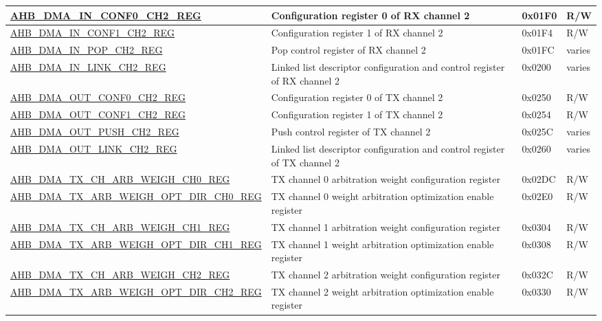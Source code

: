 \begin{longtable}{ | p{8cm} | p{8cm} | p{1.3cm} | p{1.5cm} | }
\hyperref[regdesc:AHBDMAINCONF0CHNREG]{AHB\_DMA\_IN\_CONF0\_CH2\_REG} & Configuration register 0 of RX channel 2 & 0x01F0 & R/W \\ \hline
\hyperref[regdesc:AHBDMAINCONF1CHNREG]{AHB\_DMA\_IN\_CONF1\_CH2\_REG} & Configuration register 1 of RX channel 2 & 0x01F4 & R/W \\ \hline
\hyperref[regdesc:AHBDMAINPOPCHNREG]{AHB\_DMA\_IN\_POP\_CH2\_REG} & Pop control register of RX channel 2 & 0x01FC & varies \\ \hline
\hyperref[regdesc:AHBDMAINLINKCHNREG]{AHB\_DMA\_IN\_LINK\_CH2\_REG} & Linked list descriptor configuration and control register of RX channel 2 & 0x0200 & varies \\ \hline
\hyperref[regdesc:AHBDMAOUTCONF0CHNREG]{AHB\_DMA\_OUT\_CONF0\_CH2\_REG} & Configuration register 0 of TX channel 2 & 0x0250 & R/W \\ \hline
\hyperref[regdesc:AHBDMAOUTCONF1CHNREG]{AHB\_DMA\_OUT\_CONF1\_CH2\_REG} & Configuration register 1 of TX channel 2 & 0x0254 & R/W \\ \hline
\hyperref[regdesc:AHBDMAOUTPUSHCHNREG]{AHB\_DMA\_OUT\_PUSH\_CH2\_REG} & Push control register of TX channel 2 & 0x025C & varies \\ \hline
\hyperref[regdesc:AHBDMAOUTLINKCHNREG]{AHB\_DMA\_OUT\_LINK\_CH2\_REG} & Linked list descriptor configuration and control register of TX channel 2 & 0x0260 & varies \\ \hline
\hyperref[regdesc:AHBDMATXCHARBWEIGHCHNREG]{AHB\_DMA\_TX\_CH\_ARB\_WEIGH\_CH0\_REG} & TX channel 0 arbitration weight configuration register & 0x02DC & R/W \\ \hline
\hyperref[regdesc:AHBDMATXARBWEIGHOPTDIRCHNREG]{AHB\_DMA\_TX\_ARB\_WEIGH\_OPT\_DIR\_CH0\_REG} & TX channel 0 weight arbitration optimization enable register & 0x02E0 & R/W \\ \hline
\hyperref[regdesc:AHBDMATXCHARBWEIGHCHNREG]{AHB\_DMA\_TX\_CH\_ARB\_WEIGH\_CH1\_REG} & TX channel 1 arbitration weight configuration register & 0x0304 & R/W \\ \hline
\hyperref[regdesc:AHBDMATXARBWEIGHOPTDIRCHNREG]{AHB\_DMA\_TX\_ARB\_WEIGH\_OPT\_DIR\_CH1\_REG} & TX channel 1 weight arbitration optimization enable register & 0x0308 & R/W \\ \hline
\hyperref[regdesc:AHBDMATXCHARBWEIGHCHNREG]{AHB\_DMA\_TX\_CH\_ARB\_WEIGH\_CH2\_REG} & TX channel 2 arbitration weight configuration register & 0x032C & R/W \\ \hline
\hyperref[regdesc:AHBDMATXARBWEIGHOPTDIRCHNREG]{AHB\_DMA\_TX\_ARB\_WEIGH\_OPT\_DIR\_CH2\_REG} & TX channel 2 weight arbitration optimization enable register & 0x0330 & R/W \\ \hline

\end{longtable}
